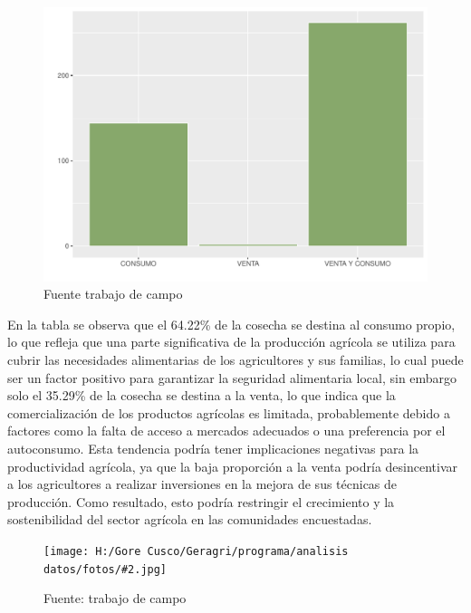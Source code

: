 \documentclass{article}\usepackage[]{graphicx}\usepackage[table]{xcolor}
\makeatletter
\def\maxwidth{ %
  \ifdim\Gin@nat@width>\linewidth
    \linewidth
  \else
    \Gin@nat@width
  \fi
}
\newenvironment{knitrout}{}{} %
\newenvironment{fotos}[2]
{\begin{figure}[H]
	\centering
	\caption{#1}
	\texttt{[image: H:/Gore Cusco/Geragri/programa/analisis datos/fotos/\#2.jpg]}
	\caption*{Fuente: trabajo de campo}}
{\end{figure}}
\newenvironment{graficas}[2]
{\begin{figure}[H]
		\centering
		\caption{#1}
		#2
		\caption*{Fuente trabajo de campo}}
{\end{figure}}
\makeatother
\begin{document}
\begin{graficas}
{Finalidad de cosecha}{
\begin{knitrout}
\definecolor{shadecolor}{rgb}{0.969, 0.969, 0.969}\color{fgcolor}
\includegraphics[width=\maxwidth]{figure/fig_treinta-1} 
\end{knitrout}
}
\end{graficas}
En la tabla se observa que el 64.22\% de la cosecha se destina al consumo propio, lo que refleja que una parte significativa de la producción agrícola se utiliza para cubrir las necesidades alimentarias de los agricultores y sus familias, lo cual puede ser un factor positivo para garantizar la seguridad alimentaria local, sin embargo solo el 35.29\% de la cosecha se destina a la venta, lo que indica que la comercialización de los productos agrícolas es limitada, probablemente debido a factores como la falta de acceso a mercados adecuados o una preferencia por el autoconsumo. Esta tendencia podría tener implicaciones negativas para la productividad agrícola, ya que la baja proporción a la venta podría desincentivar a los agricultores a realizar inversiones en la mejora de sus técnicas de producción. Como resultado, esto podría restringir el crecimiento y la sostenibilidad del sector agrícola en las comunidades encuestadas.
\begin{fotos}
{socializacion del proyecto}{28}
\end{fotos}
\end{document}
